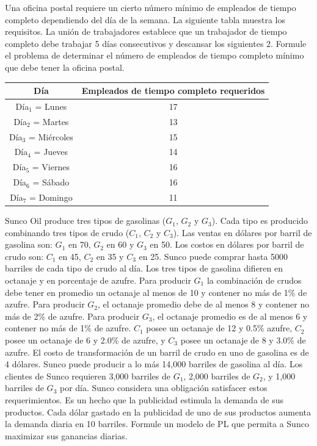 \begin{Ejer}
Una oficina postal requiere un cierto n\'umero m\'inimo de empleados de tiempo completo dependiendo del d\'ia de la semana. La siguiente tabla muestra los requisitos. La uni\'on de trabajadores establece que un trabajador de tiempo completo debe trabajar 5 d\'ias consecutivos y descansar los siguientes 2. Formule el problema de determinar el n\'umero de empleados de tiempo completo m\'inimo que debe tener la oficina postal.

\begin{center}
\begin{tabular}{|c|c|}
\hline
\textbf{D\'ia} & \textbf{Empleados de tiempo completo requeridos} \\
\hline
D\'ia$_1$ = Lunes & 17 \\
D\'ia$_2$ = Martes & 13 \\
D\'ia$_3$ = Mi\'ercoles & 15 \\
D\'ia$_4$ = Jueves & 14 \\
D\'ia$_5$ = Viernes & 16 \\
D\'ia$_6$ = S\'abado & 16 \\
D\'ia$_7$ = Domingo & 11 \\
\hline
\end{tabular}
\end{center}
\end{Ejer}

\begin{Ejer}
Sunco Oil produce tres tipos de gasolinas ($G_1$, $G_2$ y $G_3$). Cada tipo es producido combinando tres tipos de crudo ($C_1$, $C_2$ y $C_3$). Las ventas en d\'olares por barril de gasolina son: $G_1$ en 70, $G_2$ en 60 y $G_3$ en 50. Los costos en d\'olares por barril de crudo son: $C_1$ en 45, $C_2$ en 35 y $C_3$ en 25. Sunco puede comprar hasta 5000 barriles de cada tipo de crudo al d\'ia. Los tres tipos de gasolina difieren en octanaje y en porcentaje de azufre. Para producir $G_1$ la combinaci\'on de crudos debe tener en promedio un octanaje al menos de 10 y contener no m\'as de 1\% de azufre. Para producir $G_2$, el octanaje promedio debe de al menos 8 y contener no m\'as de 2\% de azufre. Para producir $G_3$, el octanaje promedio es de al menos 6 y contener no m\'as de 1\% de azufre. $C_1$ posee un octanaje de 12 y 0.5\% azufre, $C_2$ posee un octanaje de 6 y 2.0\% de azufre, y $C_3$ posee un octanaje de 8 y 3.0\% de azufre. El costo de transformaci\'on de un barril de crudo en uno de gasolina es de 4 d\'olares. Sunco puede producir a lo m\'as 14,000 barriles de gasolina al d\'ia. Los clientes de Sunco requieren 3,000 barriles de $G_1$, 2,000 barriles de $G_2$, y 1,000 barriles de $G_3$ por d\'ia. Sunco considera una obligaci\'on satisfacer estos requerimientos. Es un hecho que la publicidad estimula la demanda de sus productos. Cada d\'olar gastado en la publicidad de uno de sus productos aumenta la demanda diaria en 10 barriles. Formule un modelo de PL que permita a Sunco maximizar sus ganancias diarias.
\end{Ejer}

